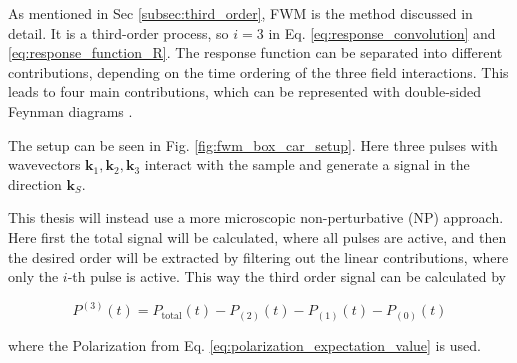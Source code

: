 \noindent
As mentioned in Sec \ref{subsec:third_order}, FWM is the method discussed in detail. It is a third-order process, so $i=3$ in Eq. \eqref{eq:response_convolution} and \eqref{eq:response_function_R}. The response function can be separated into different contributions, depending on the time ordering of the three field interactions. This leads to four main contributions, which can be represented with double-sided Feynman diagrams \cite{mukamel1995principlesnonlinearoptical}.


The setup can be seen in Fig. \ref{fig:fwm_box_car_setup}. Here three pulses with wavevectors $\mathbf{k}_1, \mathbf{k}_2, \mathbf{k}_3$ interact with the sample and generate a signal in the direction $\mathbf{k}_S$. 

\noindent
This thesis will instead use a more microscopic non-perturbative (NP) approach.
Here first the total signal will be calculated, where all pulses are active, and then the desired order will be extracted by filtering out the linear contributions, where only the $i$-th pulse is active.
This way the third order signal can be calculated by 

\begin{equation}
	P^{(3)}(t) = P_{\text{total}}(t) - P_{(2)}(t) - P_{(1)}(t) - P_{(0)}(t)
	\label{eq:third_order_signal_numerical}
\end{equation}

\noindent
where the Polarization from Eq. \eqref{eq:polarization_expectation_value} is used. 



\iffalse
\begin{figure}[ht]
	\centering
	\texttt{[image: ../figures/FWM\_scheme.pdf]}
	\caption{Schematic Four-wave mixing setup in a Boxcar geometry. ... \todoimp{Add description. Add S, Add wavevectors, Reduce amplitude of probe pulse.}}
	\label{fig:fwm_box_car_setup}
\end{figure}

\begin{figure}[ht]
	\centering
	\texttt{[image: ../figures/FWM\_scheme\_phase\_cycling.pdf]}
	\caption{Schematic Four-wave mixing setup. This is the simpler collinear phase-cycling setup, at the cost of requiring multiple measurements with varied pulse phases.
	\todoidea{add ground state at beginning, }}
	\label{fig:fwm_phase_cycling_setup}
\end{figure}
\fi

